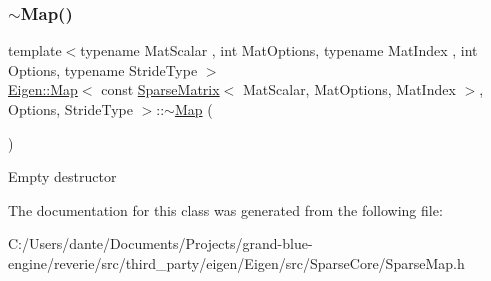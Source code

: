 \subsubsection{\texorpdfstring{$\sim$Map()}{~Map()}}
{\footnotesize\ttfamily template$<$typename Mat\+Scalar , int Mat\+Options, typename Mat\+Index , int Options, typename Stride\+Type $>$ \\
\mbox{\hyperlink{class_eigen_1_1_map}{Eigen\+::\+Map}}$<$ const \mbox{\hyperlink{class_eigen_1_1_sparse_matrix}{Sparse\+Matrix}}$<$ Mat\+Scalar, Mat\+Options, Mat\+Index $>$, Options, Stride\+Type $>$\+::$\sim$\mbox{\hyperlink{class_eigen_1_1_map}{Map}} (\begin{DoxyParamCaption}{ }\end{DoxyParamCaption})\hspace{0.3cm}{\ttfamily [inline]}}

Empty destructor 

The documentation for this class was generated from the following file\+:\begin{DoxyCompactItemize}
\item 
C\+:/\+Users/dante/\+Documents/\+Projects/grand-\/blue-\/engine/reverie/src/third\+\_\+party/eigen/\+Eigen/src/\+Sparse\+Core/Sparse\+Map.\+h\end{DoxyCompactItemize}
